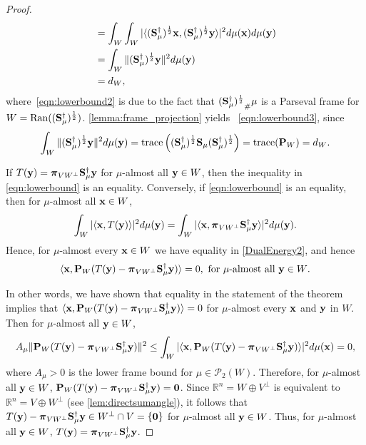 \documentclass{amsart}
\numberwithin{equation}{section}
\DeclareMathOperator{\range}{Ran}
\DeclareMathOperator{\trace}{trace}
\newcommand{\bP}{{\mathbf P}}
\newcommand{\bpi}{{\boldsymbol{\pi}}}
\theoremstyle{plain}
\theoremstyle{remark}
\theoremstyle{definition}
\begin{document}
\begin{proof}
\begin{align}
        &=  \int_{W} \int_{W}  |\langle ({\bf S}_\mu^\dagger)^{\frac{1}{2}}{\bf x}, ({\bf S}_\mu^{\dagger})^{\frac{1}{2}}{\bf y} \rangle|^2 d\mu({\bf x}) d\mu({\bf y})\nonumber \\
       &= \int_{W} \Vert ({\bf S}_\mu^\dagger)^{\frac{1}{2}}{\bf y} \Vert^2 d\mu({\bf y}) \label{eqn:lowerbound2}\\
       & = d_W,\label{eqn:lowerbound3}
     \end{align}
where~\eqref{eqn:lowerbound2} is due to the fact that ${({\bf S}_\mu^\dagger)^{\frac{1}{2}}}_\#\mu$ is a Parseval frame for $W=\range(({\bf S}_\mu^\dagger)^{\frac{1}{2}}) $. \cref{lemma:frame_projection} yields ~\eqref{eqn:lowerbound3}, since
\begin{equation*}
\begin{split}
    \int_{W} \Vert ({\bf S}_\mu^\dagger)^{\frac{1}{2}}{\bf y} \Vert^2 d\mu({\bf y}) = \trace \left(({\bf S}_\mu^\dagger)^{\frac{1}{2}} {\bf S}_\mu ({\bf S}_\mu^\dagger)^{\frac{1}{2}}\right) = \trace(\bP_W) = d_W.
\end{split}
\end{equation*}

If $T({\bf y}) =  \bpi_{VW^\perp}{\bf S}_\mu^{\dagger}{\bf y}$ for $\mu$-almost all ${\bf y} \in W$, then the inequality in \eqref{eqn:lowerbound} is an equality. Conversely, if \eqref{eqn:lowerbound} is an equality, then for $\mu$-almost all ${\bf x} \in W$, 
 \begin{equation*}
       \int_{W}  |\langle {\bf x}, T({\bf y}) \rangle|^2  d\mu({\bf y}) = \int_{W}  |\langle {\bf x}, \bpi_{VW^\perp}{\bf S}_\mu^{\dagger}{\bf y} \rangle|^2  d\mu({\bf y}).
\end{equation*}
Hence, for $\mu$-almost every ${\bf x} \in W$ we have equality in  \eqref{DualEnergy2}, and hence
$$\langle {\bf x}, \bP_W(T({\bf y}) - \bpi_{VW^\perp}{\bf S}_\mu^{\dagger}{\bf y}) \rangle =0, \ \text{for $\mu$-almost all ${\bf y} \in W$}. $$

In other words, we have shown that equality in the statement of the theorem implies that $\langle {\bf x}, \bP_W(T({\bf y}) - \bpi_{VW^\perp}{\bf S}_\mu^{\dagger}{\bf y}) \rangle =0$ for $\mu$-almost every ${\bf x}$ and ${\bf y}$ in $W$.
Then for $\mu$-almost all ${\bf y} \in W$, 
$$
A_\mu \|\bP_W(T({\bf y}) - \bpi_{VW^\perp}{\bf S}_\mu^{\dagger}{\bf y}) \|^2 \leq \int_W |\langle {\bf x}, \bP_W(T({\bf y}) - \bpi_{VW^\perp}{\bf S}_\mu^{\dagger}{\bf y}) \rangle|^2 d\mu({\bf x}) = 0 ,
$$
where $A_\mu>0$ is the lower frame bound for $\mu \in \mathcal{P}_2(W)$.
Therefore, for $\mu$-almost all ${\bf y} \in W$, $\bP_W(T({\bf y}) - \bpi_{VW^\perp}{\bf S}_\mu^{\dagger}{\bf y}) = {\bf 0}$. Since $\mathbb{R}^n = W \oplus V^\perp$ is equivalent to $\mathbb{R}^n = V \oplus W^\perp$ (see \cref{lem:directsumangle}), it follows that $T({\bf y}) - \bpi_{VW^\perp}{\bf S}_\mu^{\dagger}{\bf y} \in W^\perp \cap V  = \{\bf 0\}$ for $\mu$-almost all ${\bf y} \in W$. Thus, for $\mu$-almost all ${\bf y} \in W$, $T({\bf y}) = \bpi_{VW^\perp}{\bf S}_\mu^{\dagger}{\bf y}$. 
\end{proof}
\end{document}

